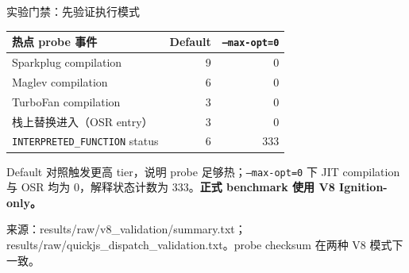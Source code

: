 \documentclass[aspectratio=169,10pt]{beamer}
\newcommand{\sourcenote}[1]{%
  {\color{NoteGray}\fontsize{6.7}{8}\selectfont #1}%
}
\newcommand{\code}[1]{\texttt{#1}}
\newcommand{\accent}[1]{\textcolor{DeepBlue}{\textbf{#1}}}
\begin{document}
\begin{frame}{实验门禁：先验证执行模式}
\vspace{0.03cm}
\centering
{\fontsize{8.5}{9.8}\selectfont
\begin{tabular}{lrr}
\toprule
\textbf{热点 probe 事件} & \textbf{Default} & \textbf{\code{--max-opt=0}} \\
\midrule
Sparkplug compilation & 9 & 0 \\
Maglev compilation & 6 & 0 \\
TurboFan compilation & 3 & 0 \\
栈上替换进入（OSR entry） & 3 & 0 \\
\code{INTERPRETED\_FUNCTION} status & 6 & 333 \\
\bottomrule
\end{tabular}}

\vspace{0.05cm}
\raggedright
Default 对照触发更高 tier，说明 probe 足够热；\code{--max-opt=0} 下 JIT compilation 与 OSR 均为 0，解释状态计数为 333。\accent{正式 benchmark 使用 V8 Ignition-only。}

\vfill
\sourcenote{来源：results/raw/v8\_validation/summary.txt；results/raw/quickjs\_dispatch\_validation.txt。probe checksum 在两种 V8 模式下一致。}
\end{frame}
\end{document}
